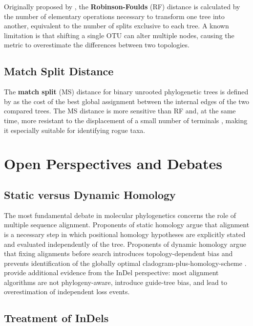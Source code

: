 Originally proposed by \textcite{robinson1981}, the \textbf{Robinson-Foulds} (RF) distance is calculated by the number of elementary operations necessary to transform one tree into another, equivalent to the number of splits exclusive to each tree. A known limitation is that shifting a single OTU can alter multiple nodes, causing the metric to overestimate the differences between two topologies.

\subsection{Match Split Distance}

The \textbf{match split} (MS) distance for binary unrooted phylogenetic trees is defined by \textcite{bogdanowicz2012} as the cost of the best global assignment between the internal edges of the two compared trees. The MS distance is more sensitive than RF and, at the same time, more resistant to the displacement of a small number of terminals \parencite{bogdanowicz2012}, making it especially suitable for identifying rogue taxa.

\section{Open Perspectives and Debates}
\label{sec:debates}

\subsection{Static versus Dynamic Homology}

The most fundamental debate in molecular phylogenetics concerns the role of multiple sequence alignment. Proponents of static homology argue that alignment is a necessary step in which positional homology hypotheses are explicitly stated and evaluated independently of the tree. Proponents of dynamic homology argue that fixing alignments before search introduces topology-dependent bias and prevents identification of the globally optimal cladogram-plus-homology-scheme \parencite{wheeleretal2006}. \textcite{redelings2024} provide additional evidence from the InDel perspective: most alignment algorithms are not phylogeny-aware, introduce guide-tree bias, and lead to overestimation of independent loss events.

\subsection{Treatment of InDels}


